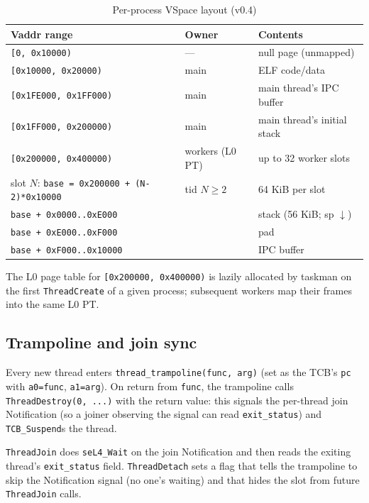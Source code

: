 \begin{table}[ht]
\centering
\small
\begin{tabular}{@{}llp{6cm}@{}}
    \toprule
    \textbf{Vaddr range} & \textbf{Owner} & \textbf{Contents} \\
    \midrule
    \texttt{[0, 0x10000)}            & --- & null page (unmapped) \\
    \texttt{[0x10000, 0x20000)}      & main & ELF code/data \\
    \texttt{[0x1FE000, 0x1FF000)}    & main & main thread's IPC buffer \\
    \texttt{[0x1FF000, 0x200000)}    & main & main thread's initial stack \\
    \texttt{[0x200000, 0x400000)}    & workers (L0 PT) & up to 32 worker slots \\
    \quad slot $N$: \texttt{base = 0x200000 + (N-2)*0x10000} & tid $N \ge 2$ & 64 KiB per slot \\
    \quad\quad \texttt{base + 0x0000..0xE000}    & & stack (56 KiB; sp $\downarrow$) \\
    \quad\quad \texttt{base + 0xE000..0xF000}    & & pad \\
    \quad\quad \texttt{base + 0xF000..0x10000}   & & IPC buffer \\
    \bottomrule
\end{tabular}
\caption{Per-process VSpace layout (v0.4)}
\end{table}

The L0 page table for \texttt{[0x200000, 0x400000)} is lazily
allocated by taskman on the first \texttt{ThreadCreate} of a given
process; subsequent workers map their frames into the same L0 PT.

\subsection{Trampoline and join sync}

Every new thread enters \texttt{thread\_trampoline(func, arg)} (set as
the TCB's \texttt{pc} with \texttt{a0=func}, \texttt{a1=arg}).  On
return from \texttt{func}, the trampoline calls
\texttt{ThreadDestroy(0, ...)} with the return value: this signals the
per-thread join Notification (so a joiner observing the signal can
read \texttt{exit\_status}) and \texttt{TCB\_Suspend}s the thread.

\texttt{ThreadJoin} does \texttt{seL4\_Wait} on the join Notification
and then reads the exiting thread's \texttt{exit\_status} field.
\texttt{ThreadDetach} sets a flag that tells the trampoline to skip
the Notification signal (no one's waiting) and that hides the slot
from future \texttt{ThreadJoin} calls.

